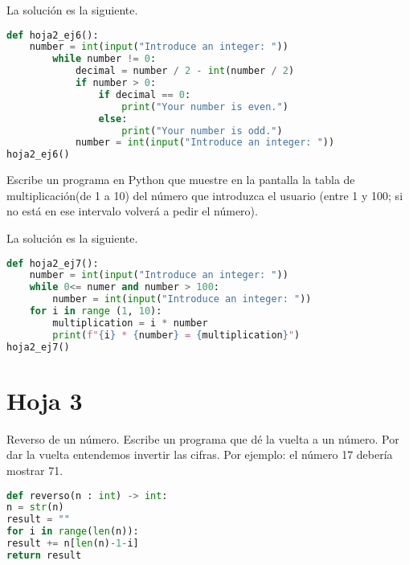 \documentclass{article}
\begin{document}
\begin{sol}
La solución es la siguiente.
\begin{lstlisting}[language = Python]
def hoja2_ej6():
    number = int(input("Introduce an integer: "))
        while number != 0:
            decimal = number / 2 - int(number / 2)
            if number > 0:
                if decimal == 0:
                    print("Your number is even.")
                else:
                    print("Your number is odd.")
            number = int(input("Introduce an integer: "))
hoja2_ej6()
\end{lstlisting}
\end{sol}

\begin{ej}
Escribe un programa en Python que muestre en la pantalla la tabla de multiplicación(de 1 a 10) del número que introduzca el usuario (entre 1 y 100; si no está en ese intervalo volverá a pedir el número).
\end{ej}

\begin{sol}
La solución es la siguiente.
\begin{lstlisting}[language = Python]
def hoja2_ej7():
    number = int(input("Introduce an integer: "))
    while 0<= numer and number > 100:
        number = int(input("Introduce an integer: "))
    for i in range (1, 10):
        multiplication = i * number
        print(f"{i} * {number} = {multiplication}")
hoja2_ej7()
\end{lstlisting}
\end{sol}

\section{Hoja 3}
\begin{ej}
Reverso de un número. Escribe un programa que dé la vuelta a un número. Por dar la vuelta entendemos invertir las cifras. Por ejemplo: el número 17 debería mostrar 71.
\end{ej}

\begin{sol}
\begin{lstlisting}[language = Python]
def reverso(n : int) -> int:
n = str(n)
result = ""
for i in range(len(n)):
result += n[len(n)-1-i]
return result
\end{lstlisting}

\end{sol}
\end{document}
